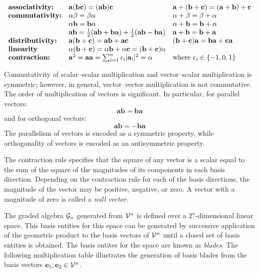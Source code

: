 \documentclass[12pt]{article}
\begin{document}
\[
\begin{array}{lll}
\mbox{\textbf{associativity:}} & \mathbf{a}(\mathbf{b}\mathbf{c}) = (\mathbf{a}\mathbf{b})\mathbf{c} & \mathbf{a}+(\mathbf{b}+\mathbf{c}) = (\mathbf{a}+\mathbf{b})+\mathbf{c} \\
\mbox{\textbf{commutativity:}} & \alpha\beta = \beta\alpha & \alpha+\beta = \beta+\alpha \\
& \alpha\mathbf{b} = \mathbf{b}\alpha & \alpha+\mathbf{b} = \mathbf{b}+\alpha \\
& \mathbf{ab} = \frac{1}{2}(\mathbf{ab} + \mathbf{ba}) + \frac{1}{2}(\mathbf{ab} - \mathbf{ba})
& \mathbf{a}+\mathbf{b} = \mathbf{b}+\mathbf{a} \\
\mbox{\textbf{distributivity:}} & \mathbf{a}(\mathbf{b}+\mathbf{c}) = \mathbf{a}\mathbf{b}+\mathbf{a}\mathbf{c} & (\mathbf{b}+\mathbf{c})\mathbf{a} = \mathbf{b}\mathbf{a}+\mathbf{c}\mathbf{a}  \\
\mbox{\textbf{linearity}} & \alpha(\mathbf{b}+\mathbf{c}) = \alpha\mathbf{b}+\alpha\mathbf{c} = (\mathbf{b}+\mathbf{c})\alpha \\
\mbox{\textbf{contraction:}} & \mathbf{a}^2 = \mathbf{a}\mathbf{a} = \sum_{i=1}^{n}\epsilon_{i}|\mathbf{a}_{i}|^2 = \alpha & \mbox{where } \epsilon_{i} \in \{-1,0,1\}
\end{array}
\]

Commutativity of scalar--scalar multiplication and vector--scalar multiplication is symmetric; however, in general, vector--vector multiplication is not commutative.  The order of multiplication of vectors is significant.  In particular, for parallel vectors:
\[
\mathbf{a}\mathbf{b} = \mathbf{b}\mathbf{a}
\]
and for orthogonal vectors:
\[
\mathbf{a}\mathbf{b} = -\mathbf{b}\mathbf{a}
\]
The parallelism of vectors is encoded as a symmetric property, while orthogonality of vectors is encoded as an antisymmetric property.

The contraction rule specifies that the square of any vector is a scalar equal to the sum of the square of the magnitudes of its components in each basis direction.  Depending on the contraction rule for each of the basis directions, the magnitude of the vector may be positive, negative, or zero.  A vector with a magnitude of zero is called a \emph{null vector}.

The graded algebra ${\cal{G}}_{n}$ generated from ${\cal{V}}^{n}$ is defined over a $2^{n}$-dimensional linear space.  This basis entities for this space can be generated by successive application of the geometric product to the basis vectors of ${\cal{V}}^{n}$ until a closed set of basis entities is obtained.  The basis entites for the space are known as \emph{blades}.  The following multiplication table illustrates the generation of basis blades from the basis vectors $\mathbf{e}_{1}, \mathbf{e}_{2} \in {\cal{V}}^{n}$.
\end{document}
